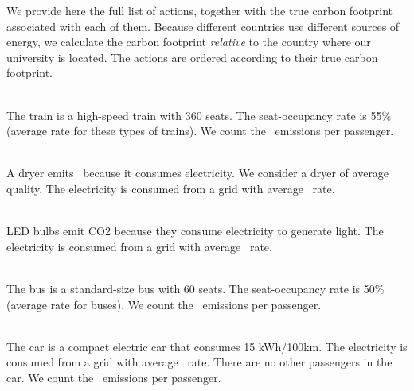 We provide here the full list of actions, together with the true carbon footprint associated with each of them.
Because different countries use different sources of energy, we calculate the carbon footprint \textit{relative} to the country where our university is located.
The actions are ordered according to their true carbon footprint.
\begin{enumerateb}
	\item {} \\
	The train is a high-speed train with 360 seats.
	The seat-occupancy rate is 55\% (average rate for these types of trains).
	We count the \COtwo\ emissions per passenger. \\
	\item {} \\
	A dryer emits \COtwo\ because it consumes electricity.
	We consider a dryer of average quality.
	The electricity is consumed from a grid with average \COtwo\ rate. \\
	\item {} \\
	LED bulbs emit CO2 because they consume electricity to generate light.
	The electricity is consumed from a grid with average \COtwo\ rate. \\
	\item {} \\
	The bus is a standard-size bus with 60 seats.
	The seat-occupancy rate is 50\% (average rate for buses).
	We count the \COtwo\ emissions per passenger. \\
	\item {} \\
	The car is a compact electric car that consumes 15 kWh/100km.
	The electricity is consumed from a grid with average \COtwo\ rate.
	There are no other passengers in the car.
	We count the \COtwo\ emissions per passenger. \\
	\item {} \\

\end{enumerateb}

